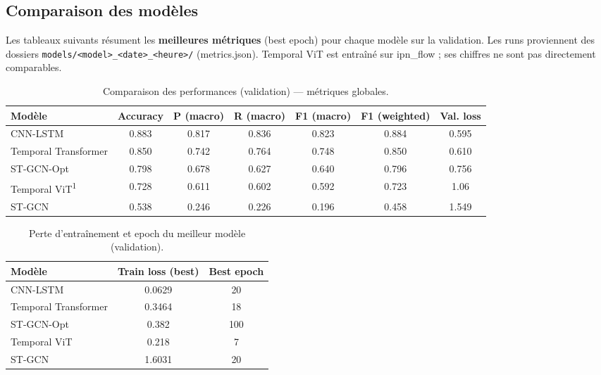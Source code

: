 \documentclass[11pt,a4paper]{article}
\begin{document}
\subsection{Comparaison des modèles}

Les tableaux suivants résument les \textbf{meilleures métriques} (best epoch) pour chaque modèle sur la validation. Les runs proviennent des dossiers \texttt{models/<model>\_<date>\_<heure>/} (metrics.json). Temporal ViT est entraîné sur ipn\_flow ; ses chiffres ne sont pas directement comparables.

\begin{table}[htbp]
  \centering
  \caption{Comparaison des performances (validation) — métriques globales.}
  \label{tab:main}
  \begin{tabular}{lcccccc}
    \toprule
    Modèle & Accuracy & P (macro) & R (macro) & F1 (macro) & F1 (weighted) & Val. loss \\
    \midrule
    CNN-LSTM           & 0.883 & 0.817 & 0.836 & 0.823 & 0.884 & 0.595 \\
    Temporal Transformer & 0.850 & 0.742 & 0.764 & 0.748 & 0.850 & 0.610 \\
    ST-GCN-Opt         & 0.798 & 0.678 & 0.627 & 0.640 & 0.796 & 0.756 \\
    Temporal ViT\textsuperscript{1} & 0.728 & 0.611 & 0.602 & 0.592 & 0.723 & 1.06 \\
    ST-GCN             & 0.538 & 0.246 & 0.226 & 0.196 & 0.458 & 1.549 \\
    \bottomrule
  \end{tabular}
\end{table}


\begin{table}[htbp]
  \centering
  \caption{Perte d’entraînement et epoch du meilleur modèle (validation).}
  \label{tab:train}
  \begin{tabular}{lcc}
    \toprule
    Modèle & Train loss (best) & Best epoch \\
    \midrule
    CNN-LSTM            & 0.0629 & 20 \\
    Temporal Transformer & 0.3464 & 18 \\
    ST-GCN-Opt          & 0.382 & 100 \\
    Temporal ViT         & 0.218  & 7 \\
    ST-GCN              & 1.6031 & 20 \\
    \bottomrule
  \end{tabular}
\end{table}
\end{document}
